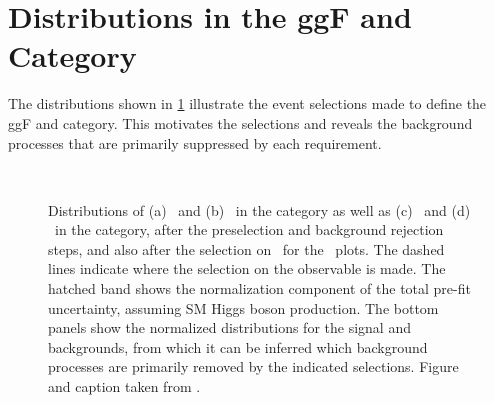 

    \clearpage
    \FloatBarrier
    \section{Distributions in the ggF \ZeroJet and \OneJet Category}
    \label{app:event-selection-ggf}

    The distributions shown in \cref{app:fig:ggf:Plots:selections} illustrate the event selections made to define the ggF \ZeroJet and \OneJet category. This motivates the selections and reveals the background processes that are primarily suppressed by each requirement.

    \begin{figure}[!h]
        \centering
         \\
        \caption[Distributions of \mll\ and \dphill\ in the \ZeroJet and \OneJet\ category.]{
            Distributions of (a) \mll\ and (b) \dphill\ in the \ZeroJet category as well as (c) \mll\ and (d) \dphill\ in the \OneJet category, after the preselection and background rejection steps, and also after the selection on \mll\ for the \dphill\ plots. The dashed lines indicate where the selection on the observable is made. The hatched band shows the normalization component of the total pre-fit uncertainty, assuming SM Higgs boson production. The bottom panels show the normalized distributions for the signal and backgrounds, from which it can be inferred which background processes are primarily removed by the indicated selections.
            Figure and caption taken from .
            \label{app:fig:ggf:Plots:selections}
        }
    \end{figure}

